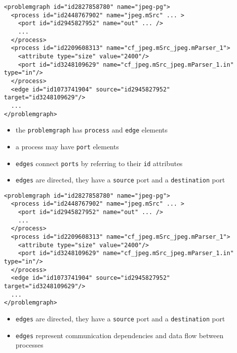 \begin{frame}[fragile=singleslide]
\begin{lstlisting}
<problemgraph id="id2827858780" name="jpeg-pg">
  <process id="id2448767902" name="jpeg.mSrc" ... >
    <port id="id2945827952" name="out" ... />
    ...
  </process>
  <process id="id2209608313" name="cf_jpeg.mSrc_jpeg.mParser_1">
    <attribute type="size" value="2400"/>
    <port id="id3248109629" name="cf_jpeg.mSrc_jpeg.mParser_1.in" type="in"/>
  </process>
  <edge id="id1073741904" source="id2945827952" target="id3248109629"/>
  ...
</problemgraph>
\end{lstlisting}
\begin{itemize}
\item the \lstinline|problemgraph| has \lstinline|process| and \lstinline|edge| elements
\item a process may have \lstinline|port| elements
\item \lstinline|edges| connect \lstinline|ports| by referring to their \lstinline|id| attributes
\item \lstinline|edges| are directed, they have a \lstinline|source| port and a \lstinline|destination| port
\end{itemize}
\end{frame}


\begin{frame}[fragile=singleslide]
\begin{lstlisting}
<problemgraph id="id2827858780" name="jpeg-pg">
  <process id="id2448767902" name="jpeg.mSrc" ... >
    <port id="id2945827952" name="out" ... />
    ...
  </process>
  <process id="id2209608313" name="cf_jpeg.mSrc_jpeg.mParser_1">
    <attribute type="size" value="2400"/>
    <port id="id3248109629" name="cf_jpeg.mSrc_jpeg.mParser_1.in" type="in"/>
  </process>
  <edge id="id1073741904" source="id2945827952" target="id3248109629"/>
  ...
</problemgraph>
\end{lstlisting}
\begin{itemize}
\item \lstinline|edges| are directed, they have a \lstinline|source| port and a \lstinline|destination| port
\item \lstinline|edges| represent communication dependencies and data flow between processes
\end{itemize}
\end{frame}


